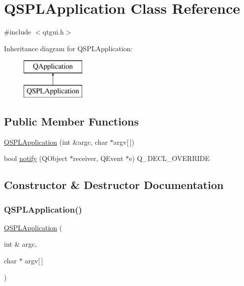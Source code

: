 \hypertarget{classQSPLApplication}{}\section{Q\+S\+P\+L\+Application Class Reference}
\label{classQSPLApplication}


{\ttfamily \#include $<$qtgui.\+h$>$}

Inheritance diagram for Q\+S\+P\+L\+Application\+:\begin{figure}[H]
\begin{center}
\leavevmode
\includegraphics[height=2.000000cm]{classQSPLApplication}
\end{center}
\end{figure}
\subsection*{Public Member Functions}
\begin{DoxyCompactItemize}
\item 
\mbox{\hyperlink{classQSPLApplication_afda8e7879376db80981cf96348d04b52}{Q\+S\+P\+L\+Application}} (int \&argc, char $\ast$argv\mbox{[}$\,$\mbox{]})
\item 
bool \mbox{\hyperlink{classQSPLApplication_a5552998f9e365b2cfd7b3eaf9d9a3de6}{notify}} (Q\+Object $\ast$receiver, Q\+Event $\ast$e) Q\+\_\+\+D\+E\+C\+L\+\_\+\+O\+V\+E\+R\+R\+I\+DE
\end{DoxyCompactItemize}


\subsection{Constructor \& Destructor Documentation}
\mbox{\label{classQSPLApplication_afda8e7879376db80981cf96348d04b52}} 
\subsubsection{\texorpdfstring{Q\+S\+P\+L\+Application()}{QSPLApplication()}}
{\footnotesize\ttfamily \mbox{\hyperlink{classQSPLApplication}{Q\+S\+P\+L\+Application}} (\begin{DoxyParamCaption}\item[{int \&}]{argc,  }\item[{char $\ast$}]{argv\mbox{[}$\,$\mbox{]} }\end{DoxyParamCaption})}



